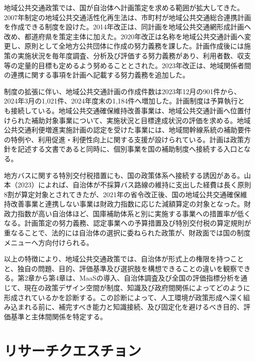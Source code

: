 地域公共交通政策では、国が自治体へ計画策定を求める範囲が拡大してきた。2007年制定の地域公共交通活性化再生法は、市町村が地域公共交通総合連携計画を作成できる制度を設けた。2014年改正は、同計画を地域公共交通網形成計画へ改め、都道府県を策定主体に加えた\cite{mlit2014networkplan}。2020年改正は名称を地域公共交通計画へ変更し、原則として全地方公共団体に作成の努力義務を課した。計画作成後には施策の実施状況を毎年度調査、分析及び評価する努力義務があり、利用者数、収支等の定量的目標も定めるよう努めることとされた\cite{regionaltransportact,mlit2020planobligation}。2023年改正は、地域関係者間の連携に関する事項を計画へ記載する努力義務を追加した\cite{mlit2023redesign}。

制度の拡張に伴い、地域公共交通計画の作成件数は2023年12月の901件から、2024年3月の1,021件、2024年度末の1,184件へ増加した\cite{mlit2024substantialization,mlit2025plantrend}。計画制度は予算執行とも接続している。地域公共交通確保維持改善事業は、地域公共交通計画へ位置付けられた補助対象事業について、実施状況と目標達成状況の評価を求める。地域公共交通利便増進実施計画の認定を受けた事業には、地域間幹線系統の補助要件の特例や、利用促進・利便性向上に関する支援が設けられている\cite{mlittransportsubsidy,mlitredesignbudget}。計画は政策方針を記述する文書であると同時に、個別事業を国の補助制度へ接続する入口となる。

地方バスに関する特別交付税措置にも、国の政策体系へ接続する誘因がある。山本（2023）によれば、自治体が不採算バス路線の維持に支出した経費は長く原則8割が算定対象とされてきたが、2021年の省令改正後、国の地域公共交通確保維持改善事業と連携しない事業は財政力指数に応じた減額算定の対象となった\cite{yamamoto2023busgrant,specialallocationtaxregulation}。財政力指数が高い自治体ほど、国庫補助体系と別に実施する事業への措置率が低くなる。計画策定の努力義務、認定事業への予算措置及び特別交付税の算定規則が重なることで、法的には自治体の選択に委ねられた政策が、財政面では国の制度メニューへ方向付けられる。

以上の特徴により、地域公共交通政策では、自治体が形式上の権限を持つことと、独自の問題、目的、評価基準及び選択肢を構想できることの違いを観察できる。第2章から第4章は、MaaSの導入、自治体調査及び全国の評価指標分析を通じて、現在の政策デザイン空間が制度、知識及び政府間関係によってどのように形成されているかを診断する。この診断によって、人工環境が政策形成へ深く組み込まれる前に、補完すべき能力と知識接続、及び固定化を避けるべき目的、評価基準と主体間関係を特定する。

\section{リサーチクエスチョン}
\label{sec:intro_research_questions}

